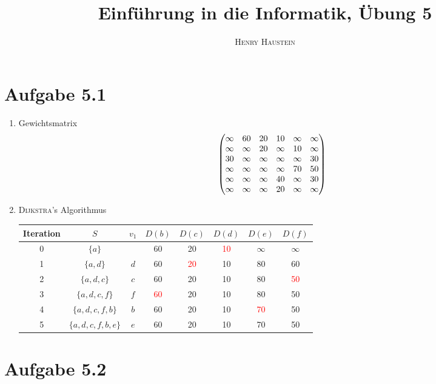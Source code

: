 \documentclass{article}
\title{\textbf{Einführung in die Informatik, Übung 5}}
\author{\textsc{Henry Haustein}}
\date{}
\begin{document}
	\maketitle
	
	\section*{Aufgabe 5.1}
	
	\begin{enumerate}[label=(\alph*)]
		\item Gewichtsmatrix
		\begin{align}
		\begin{pmatrix}
		\infty & 60 & 20 & 10 & \infty & \infty \\
		\infty & \infty & 20 & \infty & 10 & \infty \\
		30 & \infty & \infty & \infty & \infty & 30 \\
		\infty & \infty & \infty & \infty & 70 & 50 \\
		\infty & \infty & \infty & 40 & \infty & 30 \\
		\infty & \infty & \infty & 20 & \infty & \infty \\
		\end{pmatrix}\notag
		\end{align}
		\item \textsc{Dijkstra}'s Algorithmus
		\begin{center}
			\begin{tabular}{c|ccccccc}
				\textbf{Iteration} & $S$ & $v_1$ & $D(b)$ & $D(c)$ & $D(d)$ & $D(e)$ & $D(f)$ \\
				\hline
				0 & $\{a\}$ & & 60 & 20 & \textcolor{red}{10} & $\infty$ & $\infty$ \\
				1 & $\{a,d\}$ & $d$ & 60 & \textcolor{red}{20} & 10 & 80 & 60 \\
				2 & $\{a,d,c\}$ & $c$ & 60 & 20 & 10 & 80 & \textcolor{red}{50} \\
				3 & $\{a,d,c,f\}$ & $f$ & \textcolor{red}{60} & 20 & 10 & 80 & 50 \\
				4 & $\{a,d,c,f,b\}$ & $b$ & 60 & 20 & 10 & \textcolor{red}{70} & 50 \\
				5 & $\{a,d,c,f,b,e\}$ & $e$ & 60 & 20 & 10 & 70 & 50 \\
			\end{tabular}
		\end{center}
	\end{enumerate}
	
	\section*{Aufgabe 5.2}
	
\end{document}
